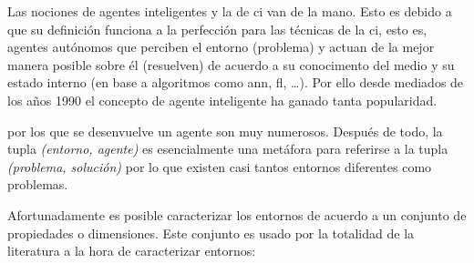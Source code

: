 Las nociones de agentes inteligentes y la de \ac{ci} van de la mano. Esto es debido a que su definición funciona a la perfección para las técnicas de la \ac{ci}, esto es, agentes autónomos que perciben el entorno (problema) y actuan de la mejor manera posible sobre él (resuelven) de acuerdo a su conocimento del medio y su estado interno (en base a algoritmos como \ac{ann}, \ac{fl}, \ldots). Por ello desde mediados de los años 1990 el concepto de agente inteligente ha ganado tanta popularidad.

 por los que se desenvuelve un agente son muy numerosos. Después de todo, la tupla \textit{(entorno, agente)} es esencialmente una metáfora para referirse a la tupla \textit{(problema, solución)} por lo que existen casi tantos entornos diferentes como problemas.

Afortunadamente es posible caracterizar los entornos de acuerdo a un conjunto de propiedades o dimensiones. Este conjunto es usado por la totalidad de la literatura a la hora de caracterizar entornos:

